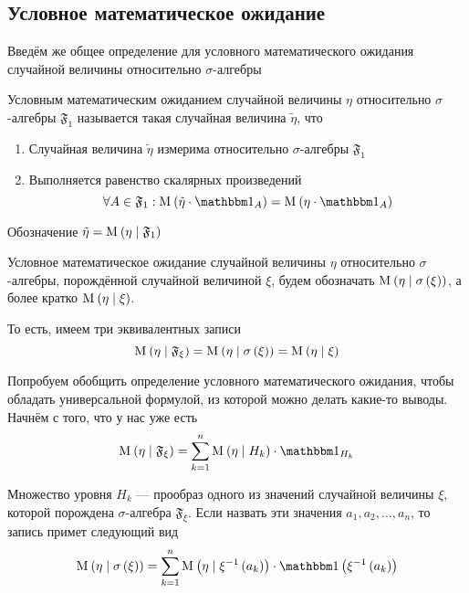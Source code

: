 \subsection{Условное математическое ожидание}
Введём же общее определение для условного математического ожидания
случайной величины относительно $\sigma$-алгебры

\begin{definition}
    Условным математическим ожиданием случайной величины $\eta$
    относительно $\sigma$-алгебры $\mathfrak{F}_1$
    называется такая случайная величина $\tilde{\eta}$, что
    \begin{enumerate}
        \item Случайная величина $\tilde{\eta}$
                измерима относительно $\sigma$-алгебры $\mathfrak{F}_1$
        \item Выполняется равенство скалярных произведений
            $$\forall A \in \mathfrak{F}_1:
                \mean{\left( \tilde{\eta} \cdot \indicatorof{A} \right)}
                    = \mean{\left( \eta \cdot \indicatorof{A} \right)}$$
    \end{enumerate}
    Обозначение $\tilde{\eta} = \mathrm{M}_{} \left( \eta \mid \mathfrak{F}_1 \right)$

\end{definition}

\begin{remark}
    Условное математическое ожидание случайной величины $\eta$
    относительно $\sigma$-алгебры, порождённой случайной величиной $\xi$,
    будем обозначать $\mathrm{M}_{} \left( \eta \mid \sigma\left( \xi \right) \right)$,
    а более кратко $\mathrm{M}_{} \left( \eta \mid \xi \right)$.

    То есть, имеем три эквивалентных записи
    $$\mathrm{M}_{} \left( \eta \mid \mathfrak{F}_{\xi} \right)
        = \mathrm{M}_{} \left( \eta \mid \sigma\left( \xi \right) \right)
        = \mathrm{M}_{} \left( \eta \mid \xi \right)$$
\end{remark}


Попробуем обобщить определение условного математического ожидания,
чтобы обладать универсальной формулой, из которой можно делать какие-то выводы.
Начнём с того, что у нас уже есть
$$\mean{\left( \eta \mid \mathfrak{F}_\xi \right)}
    = \sum_{k=1}^n \mean{\left( \eta \mid H_k \right)} \cdot \indicatorof{H_k}$$

Множество уровня $H_k$ --- прообраз одного из значений случайной величины $\xi$,
которой порождена $\sigma$-алгебра $\mathfrak{F}_\xi$.
Если назвать эти значения $a_1, a_2, \dots, a_n$, то запись примет следующий вид
\begin{equation}\label{conditionalExpectationUgly}
    \mean{\left( \eta \mid \sigma\left( \xi \right) \right)}
        = \sum_{k=1}^n \mean{\left( \eta \mid \xi^{-1}\left( a_k \right) \right)
            \cdot \indicator{\xi^{-1}\left( a_k \right)}}
\end{equation}

